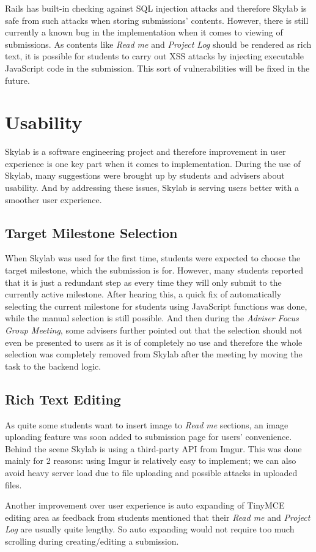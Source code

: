 Rails has built-in checking against SQL injection attacks and therefore Skylab is safe from such attacks when storing submissions' contents\cite{citation11}. However, there is still currently a known bug in the implementation when it comes to viewing of submissions. As contents like \textit{Read me} and \textit{Project Log} should be rendered as rich text, it is possible for students to carry out XSS attacks by injecting executable JavaScript code in the submission. This sort of vulnerabilities will be fixed in the future.

\section{Usability}

Skylab is a software engineering project and therefore improvement in user experience is one key part when it comes to implementation. During the use of Skylab, many suggestions were brought up by students and advisers about usability. And by addressing these issues, Skylab is serving users better with a smoother user experience.

\subsection{Target Milestone Selection}

When Skylab was used for the first time, students were expected to choose the target milestone, which the submission is for. However, many students reported that it is just a redundant step as every time they will only submit to the currently active milestone. After hearing this, a quick fix of automatically selecting the current milestone for students using JavaScript functions was done, while the manual selection is still possible. And then during the \textit{Adviser Focus Group Meeting}, some advisers further pointed out that the selection should not even be presented to users as it is of completely no use and therefore the whole selection was completely removed from Skylab after the meeting by moving the task to the backend logic. 

\subsection{Rich Text Editing}

As quite some students want to insert image to \textit{Read me} sections, an image uploading feature was soon added to submission page for users' convenience. Behind the scene Skylab is using a third-party API from Imgur. This was done mainly for 2 reasons: using Imgur is relatively easy to implement; we can also avoid heavy server load due to file uploading and possible attacks in uploaded files.

Another improvement over user experience is auto expanding of TinyMCE editing area as feedback from students mentioned that their \textit{Read me} and \textit{Project Log} are usually quite lengthy. So auto expanding would not require too much scrolling during creating/editing a submission.
